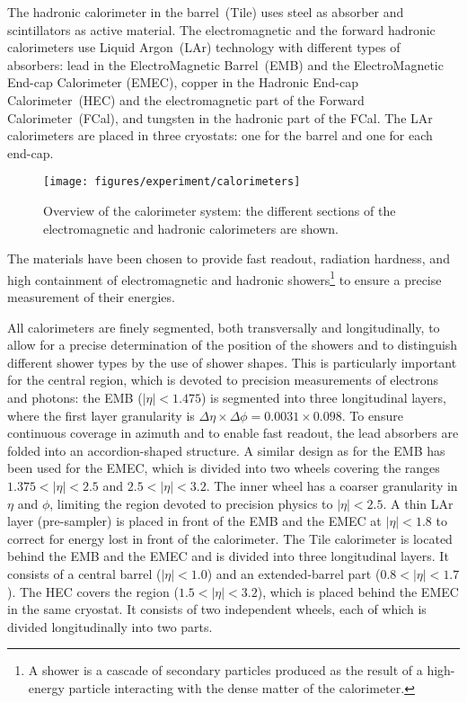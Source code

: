 The hadronic calorimeter in the barrel~(Tile) uses steel as absorber
and scintillators as active material.
The electromagnetic and the forward hadronic calorimeters use Liquid
Argon~(LAr) technology with different types of absorbers:
lead in the ElectroMagnetic Barrel~(EMB) and the ElectroMagnetic
End-cap Calorimeter (EMEC), copper in the Hadronic End-cap
Calorimeter~(HEC) and the electromagnetic part of the Forward
Calorimeter~(FCal), and tungsten in the hadronic part of the FCal.
The LAr calorimeters are placed in three cryostats: one for the barrel
and one for each end-cap.
\begin{figure}[ht]
\begin{center}
\texttt{[image: figures/experiment/calorimeters]}
\caption[Overview of the calorimeter system]{
  Overview of the calorimeter system:
  the different sections of the electromagnetic and hadronic calorimeters are shown.}
\label{fig:calorimeters}
\end{center}
\end{figure}
The materials have been chosen to provide fast readout, 
radiation hardness, and high containment of electromagnetic and
hadronic showers\footnote{A shower is a cascade of secondary particles produced 
as the result of a high-energy particle interacting with the dense matter of the calorimeter.} 
to ensure a precise measurement of their energies.

All calorimeters are finely segmented, both transversally and
longitudinally, to allow for a precise determination of the position
of the showers and to distinguish different shower types by the use of
shower shapes. This is particularly important for the central region, 
which is devoted to precision measurements of electrons and photons:
the EMB (\mbox{$|\eta| < 1.475$}) is segmented into three longitudinal
layers, where the first layer granularity is
$\Delta\eta\times\Delta\phi=0.0031\times0.098$. 
To ensure continuous coverage in azimuth and to enable fast readout, 
the lead absorbers are folded into an accordion-shaped structure.
A similar design as for the EMB has been used for the EMEC, 
which is divided into two wheels covering the ranges \mbox{$1.375 < |\eta| < 2.5$}
and \mbox{$2.5 < |\eta| < 3.2$}.
The inner wheel has a coarser granularity in $\eta$ and $\phi$, 
limiting the region devoted to precision physics to \mbox{$|\eta| < 2.5$}.
A thin LAr layer (pre-sampler) is placed in front of the EMB and the
EMEC at \mbox{$|\eta| < 1.8$} to correct for energy lost in front of the calorimeter.
The Tile calorimeter is located behind the EMB and the EMEC and is
divided into three longitudinal layers. It consists of a central
barrel (\mbox{$|\eta| < 1.0$}) and an extended-barrel part (\mbox{$0.8
  < |\eta| < 1.7$}). 
The HEC covers the region (\mbox{$1.5 < |\eta| < 3.2$}), which is
placed behind the EMEC in the same cryostat. It consists of two
independent wheels, each of which is divided longitudinally into two
parts. 


